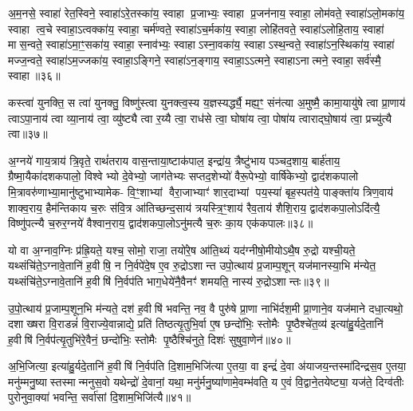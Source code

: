 अ॒म॒नसे॒ स्वाहा॑ रेत॒स्विने॒ स्वाहा॑ऽरे॒तस्का॑य॒ स्वाहा प्र॒जाभ्यः॒ स्वाहा प्र॒जन॑नाय॒ स्वाहा॒ लोम॑वते॒ स्वाहा॑ऽलो॒मका॑य॒ स्वाहा त्व॒चे स्वाहा॒ऽत्वक्का॑य॒ स्वाहा॒ चर्म॑ण्वते॒ स्वाहा॑ऽच॒र्मका॑य॒ स्वाहा॒ लोहि॑तवते॒ स्वाहा॑ऽलोहि॒ताय॒ स्वाहा॑ मास॒न्वते॒ स्वाहा॑ऽमा॒ꣳ॒सका॑य॒ स्वाहा॒ स्नाव॑भ्यः॒ स्वाहाऽस्ना॒वका॑य॒ स्वाहाऽस्थ॒न्वते॒ स्वाहा॑ऽन॒स्थिका॑य॒ स्वाहा॑ मज्ज॒न्वते॒ स्वाहा॑ऽम॒ज्जका॑य॒ स्वाहा॒ऽङ्गिने॒ स्वाहा॑ऽन॒ङ्गाय॒ स्वाहा॒ऽऽत्मने॒ स्वाहाऽनात्मने॒ स्वाहा॒ सर्व॑स्मै॒ स्वाहा॥३६॥

{\anuvakamend[{म॒न॒स्विने॒ स्वाहाऽनात्मने॒ स्वाहा॒ द्वे च॑॥12॥}]}

कस्त्वा॑ युनक्ति॒ स त्वा॑ युनक्तु॒ विष्णु॑स्त्वा युनक्त्व॒स्य य॒ज्ञस्यर्द्ध्यै॒ मह्य॒ꣳ॒ संन॑त्या अ॒मुष्मै॒ कामा॒यायु॑षे त्वा प्रा॒णाय॑ त्वाऽपा॒नाय॑ त्वा व्या॒नाय॑ त्वा॒ व्यु॑ष्ट्यै त्वा र॒य्यै त्वा॒ राध॑से त्वा॒ घोषा॑य त्वा॒ पोषा॑य त्वाराद्घो॒षाय॑ त्वा॒ प्रच्यु॑त्यै त्वा॥३७॥

{\anuvakamend[{कस्त्वा॒ऽष्टात्रिꣳ॑शत्॥13॥}]}

अ॒ग्नये॑ गाय॒त्राय॑ त्रि॒वृते॒ राथं॑तराय वास॒न्ताया॒ष्टाक॑पाल॒ इन्द्रा॑य॒ त्रैष्टु॑भाय पञ्चद॒शाय॒ बार्\mbox{}ह॑ताय॒ ग्रैष्मा॒यैका॑दशकपालो॒ विश्वेभ्यो दे॒वेभ्यो॒ जाग॑तेभ्यः सप्तद॒शेभ्यो॑ वैरू॒पेभ्यो॒ वार्\mbox{}षि॑केभ्यो॒ द्वाद॑शकपालो मि॒त्रावरु॑णाभ्या॒मानु॑ष्टुभाभ्यामेक- वि॒ꣳ॒शाभ्यां वैरा॒जाभ्याꣳ॑ शार॒दाभ्यां पय॒स्या॑ बृह॒स्पत॑ये॒ पाङ्क्ता॑य त्रिण॒वाय॑ शाक्व॒राय॒ हैम॑न्तिकाय च॒रुः स॑वि॒त्र आ॑तिच्छन्द॒साय॑ त्रयस्त्रि॒ꣳ॒शाय॑ रैव॒ताय॑ शैशि॒राय॒ द्वाद॑शकपा॒लोऽदि॑त्यै॒ विष्णु॑पत्न्यै च॒रुर॒ग्नये॑ वैश्वान॒राय॒ द्वाद॑शकपा॒लोऽनु॑मत्यै च॒रुः का॒य एक॑कपालः॥३८॥

{\anuvakamend[{अ॒ग्नयेऽदि॑त्या॒ अनु॑मत्यै स॒प्तच॑त्वारिशत्॥14॥}]}

यो वा अ॒ग्नाव॒ग्निः प्र॑ह्रि॒यते॒ यश्च॒ सोमो॒ राजा॒ तयो॑रे॒ष आ॑ति॒थ्यं यद॑ग्नीषो॒मीयोऽथै॒ष रु॒द्रो यश्ची॒यते॒ यथ्संचि॑ते॒ऽग्नावे॒तानि॑ ह॒वीषि॒ न नि॒र्वपे॑दे॒ष ए॒व रु॒द्रोऽशान्त उपो॒त्थाय॑ प्र॒जाम्प॒शून् यज॑मानस्या॒भि म॑न्येत॒ यथ्संचि॑ते॒ऽग्नावे॒तानि॑ ह॒वीषि॑ नि॒र्वप॑ति भाग॒धेये॑नै॒वैनꣳ॑ शमयति॒ नास्य॑ रु॒द्रोऽशान्तः॥३९॥

उ॒पो॒त्थाय॑ प्र॒जाम्प॒शून॒भि म॑न्यते॒ दश॑ ह॒वीषि॑ भवन्ति॒ नव॒ वै पुरु॑षे प्रा॒णा नाभि॑र्दश॒मी प्रा॒णाने॒व यज॑माने दधा॒त्यथो॒ दशाख्षरा वि॒राडन्नं॑ वि॒राज्ये॒वान्नाद्ये॒ प्रति॑ तिष्ठत्यृ॒तुभि॒र्वा ए॒ष छन्दो॑भिः॒ स्तोमैः पृ॒ष्ठैश्चे॑त॒व्य॑ इत्या॑हु॒र्यदे॒तानि॑ ह॒वीषि॑ नि॒र्वप॑त्यृ॒तुभि॑रे॒वैनं॒ छन्दो॑भिः॒ स्तोमैः पृ॒ष्ठैश्चि॑नुते॒ दिशः॑ सुषुवा॒णेन॑॥४०॥

अ॒भि॒जित्या॒ इत्या॑हु॒र्यदे॒तानि॑ ह॒वीषि॑ नि॒र्वप॑ति दि॒शाम॒भिजि॑त्या ए॒तया॒ वा इन्द्रं॑ दे॒वा अ॑याजय॒न्तस्मा॑दिन्द्रस॒व ए॒तया॒ मनु॑म्मनु॒ष्यास्तस्मान्मनुस॒वो यथेन्द्रो॑ दे॒वानां॒ यथा॒ मनु॑र्मनु॒ष्या॑णामे॒वम्भ॑वति॒ य ए॒वं वि॒द्वाने॒तयेष्ट्या॒ यज॑ते॒ दिग्व॑तीः पुरोनुवा॒क्या॑ भवन्ति॒ सर्वा॑सां दि॒शाम॒भिजि॑त्यै॥४१॥

